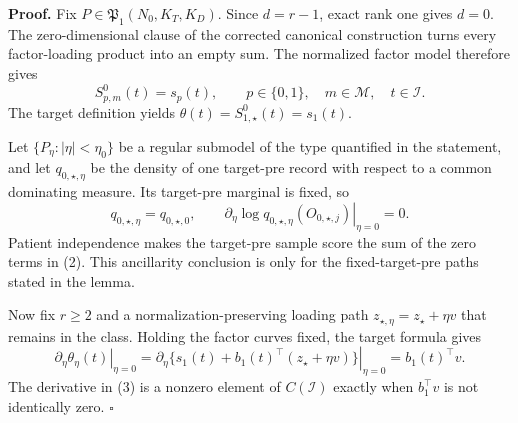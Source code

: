 \textbf{Proof.}
Fix \(P\in\mathfrak P_1(N_0,K_T,K_D)\). Since \(d=r-1\), exact rank one gives \(d=0\). The zero-dimensional clause of the corrected canonical construction turns every factor-loading product into an empty sum. The normalized factor model therefore gives
\[
 S^0_{p,m}(t)=s_p(t),
 \qquad p\in\{0,1\},\quad m\in\mathcal M,\quad t\in\mathcal I. \tag{1}
\]
The target definition yields \(\theta(t)=S^0_{1,\star}(t)=s_1(t)\).

Let \(\{P_\eta:|\eta|<\eta_0\}\) be a regular submodel of the type quantified in the statement, and let \(q_{0,\star,\eta}\) be the density of one target-pre record with respect to a common dominating measure. Its target-pre marginal is fixed, so
\[
 q_{0,\star,\eta}=q_{0,\star,0},
 \qquad
 \left.\partial_\eta\log q_{0,\star,\eta}(O_{0,\star,j})
 \right|_{\eta=0}=0.                                    \tag{2}
\]
Patient independence makes the target-pre sample score the sum of the zero terms in (2). This ancillarity conclusion is only for the fixed-target-pre paths stated in the lemma.

Now fix \(r\ge2\) and a normalization-preserving loading path \(z_{\star,\eta}=z_\star+\eta v\) that remains in the class. Holding the factor curves fixed, the target formula gives
\[
 \left.\partial_\eta\theta_\eta(t)\right|_{\eta=0}
 =\left.\partial_\eta
 \{s_1(t)+b_1(t)^\top(z_\star+\eta v)\}\right|_{\eta=0}
 =b_1(t)^\top v.                                        \tag{3}
\]
The derivative in (3) is a nonzero element of \(C(\mathcal I)\) exactly when \(b_1^\top v\) is not identically zero. \(\square\)
